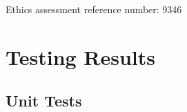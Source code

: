 \documentclass[a4paper,10pt]{report}
\begin{document}
Ethics assessment reference number: 9346
\begin{figure}[h!]
    \centering

\end{figure}


\chapter{Testing Results}
\section{Unit Tests}
\end{document}
